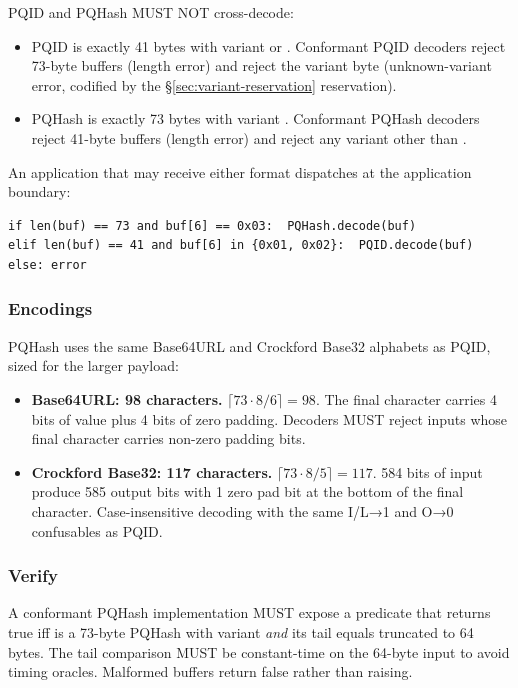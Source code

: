 PQID and PQHash MUST NOT cross-decode:
\begin{itemize}
  \item PQID is exactly 41 bytes with variant  or . Conformant PQID decoders reject 73-byte buffers (length error) and reject the  variant byte (unknown-variant error, codified by the §\ref{sec:variant-reservation} reservation).
  \item PQHash is exactly 73 bytes with variant . Conformant PQHash decoders reject 41-byte buffers (length error) and reject any variant other than .
\end{itemize}

An application that may receive either format dispatches at the application boundary:

\begin{lstlisting}
if len(buf) == 73 and buf[6] == 0x03:  PQHash.decode(buf)
elif len(buf) == 41 and buf[6] in {0x01, 0x02}:  PQID.decode(buf)
else: error
\end{lstlisting}

\subsubsection{Encodings}

PQHash uses the same Base64URL and Crockford Base32 alphabets as PQID, sized for the larger payload:

\begin{itemize}
  \item \textbf{Base64URL: 98 characters.} $\lceil 73 \cdot 8 / 6 \rceil = 98$. The final character carries 4 bits of value plus 4 bits of zero padding. Decoders MUST reject inputs whose final character carries non-zero padding bits.
  \item \textbf{Crockford Base32: 117 characters.} $\lceil 73 \cdot 8 / 5 \rceil = 117$. 584 bits of input produce 585 output bits with 1 zero pad bit at the bottom of the final character. Case-insensitive decoding with the same I/L→1 and O→0 confusables as PQID.
\end{itemize}

\subsubsection{Verify}

A conformant PQHash implementation MUST expose a  predicate that returns true iff  is a 73-byte PQHash with variant  \emph{and} its tail equals  truncated to 64 bytes. The tail comparison MUST be constant-time on the 64-byte input to avoid timing oracles. Malformed buffers return false rather than raising.

